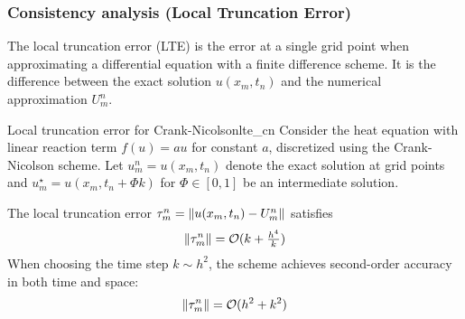 \subsubsection{Consistency analysis (Local Truncation Error)}
The local truncation error (LTE) is the error at a single grid point when approximating a differential equation with a finite difference scheme.
It is the difference between the exact solution \(u(x_m, t_n)\) and the numerical approximation \(U_m^n\).

\begin{theorem}{Local truncation error for Crank-Nicolson}{lte_cn}
  Consider the heat equation with linear reaction term \(f(u) = au\) for constant \(a\), discretized using the Crank-Nicolson scheme. Let \(u_m^n = u(x_m,t_n)\) denote the exact solution at grid points and \(u_m^\star = u(x_m, t_n + \Phi k)\) for \(\Phi \in [0,1]\) be an intermediate solution.

  The local truncation error \(\tau_m^n = \lVert u(x_m, t_n) - U_m^n\rVert\) satisfies
  \[
    \lVert\tau_m^n\rVert = \mathcal{O}(k + \tfrac{h^4}{k})
  \]
  When choosing the time step \(k \sim h^2\), the scheme achieves second-order accuracy in both time and space:
  \[
    \lVert\tau_m^n\rVert = \mathcal{O}(h^2 + k^2)
  \]
\end{theorem}
